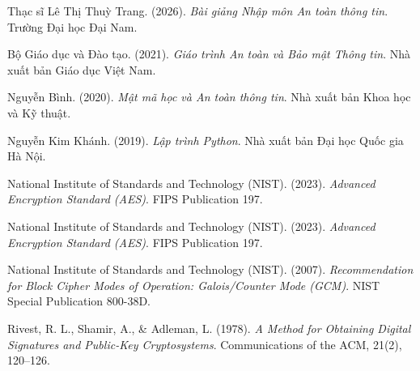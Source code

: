 
\begin{enumerate}[label={[\arabic*]}]

\item Thạc sĩ Lê Thị Thuỳ Trang. (2026). \textit{Bài giảng Nhập môn An toàn thông tin}. Trường Đại học Đại Nam.

\item Bộ Giáo dục và Đào tạo. (2021). \textit{Giáo trình An toàn và Bảo mật Thông tin}. Nhà xuất bản Giáo dục Việt Nam.

\item Nguyễn Bình. (2020). \textit{Mật mã học và An toàn thông tin}. Nhà xuất bản Khoa học và Kỹ thuật.

\item Nguyễn Kim Khánh. (2019). \textit{Lập trình Python}. Nhà xuất bản Đại học Quốc gia Hà Nội.

\item National Institute of Standards and Technology (NIST). (2023). \textit{Advanced Encryption Standard (AES)}. FIPS Publication 197.

\item National Institute of Standards and Technology (NIST). (2023). \textit{Advanced Encryption Standard (AES)}. FIPS Publication 197.

\item National Institute of Standards and Technology (NIST). (2007). \textit{Recommendation for Block Cipher Modes of Operation: Galois/Counter Mode (GCM)}. NIST Special Publication 800-38D.

\item Rivest, R. L., Shamir, A., \& Adleman, L. (1978). \textit{A Method for Obtaining Digital Signatures and Public-Key Cryptosystems}. Communications of the ACM, 21(2), 120--126.

\end{enumerate}